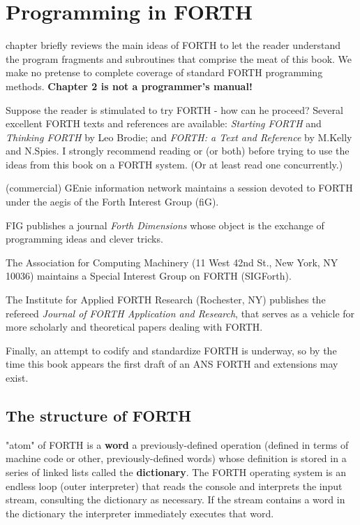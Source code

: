 ﻿%

\chapter{Programming in FORTH}

 chapter briefly reviews the main ideas of FORTH to let the reader understand the program fragments and subroutines that comprise the meat of this book. We make no pretense to complete coverage of standard FORTH programming methods. \textbf{Chapter 2 is not a programmer’s manual!}

Suppose the reader is stimulated to try FORTH - how can he proceed? Several excellent FORTH texts and references are available: \textit{Starting FORTH}  and \textit{Thinking FORTH}  by Leo Brodie; and \textit{ FORTH: a Text and Reference}  by M.Kelly and N.Spies. I strongly recommend reading \FTR or \SF (or both) before trying to use the ideas from this book on a FORTH system. (Or at least read one concurrently.)

 (commercial) GEnie information network maintains a session devoted to FORTH under the aegis of the Forth Interest Group (fiG).

FIG publishes a journal \textit{Forth Dimensions} whose object is the exchange of programming ideas and clever tricks.

The Association for Computing Machinery (11 West 42nd St., New York, NY 10036) maintains a Special Interest Group on FORTH (SIGForth).

The Institute for Applied FORTH Research (Rochester, NY) publishes the refereed \textit{Journal of FORTH Application and Research}, that serves as a vehicle for more scholarly and theoretical papers dealing with FORTH.

Finally, an attempt to codify and standardize FORTH is underway, so by the time this book appears the first draft of an ANS FORTH and extensions may exist.

\section{The structure of FORTH}\label{chap:02_01}

 "atom" of FORTH is a \textbf{word} a previously-defined operation (defined in terms of machine code or other, previously-defined words) whose definition is stored in a series of linked lists called the \textbf{dictionary}. The FORTH operating system is an endless loop (outer interpreter) that reads the console and interprets the input stream, consulting the dictionary as necessary. If the stream contains a word in the dictionary the interpreter immediately executes that word.

